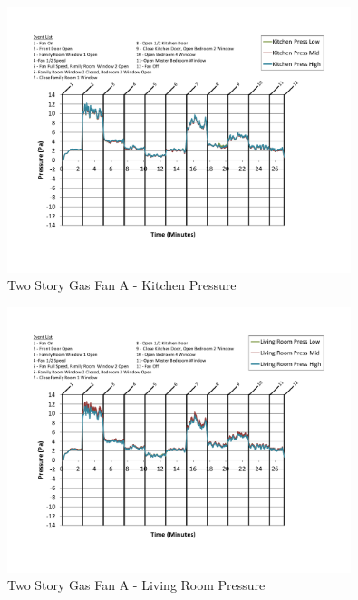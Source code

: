 \documentclass{article}
\begin{document}
\begin{appendices}
	\begin{figure}[H]
		\centering
		\includegraphics[height=3.05in,trim=0.67in 1.1in 0.67in 0.8in,clip=true]{0_Images/Results_Charts/ColdFlow/Two_Story/Gas/A/Kitchen_Pressure.pdf}
		\caption{Two Story Gas Fan A - Kitchen Pressure}
	\end{figure}
 

	\begin{figure}[H]
		\centering
		\includegraphics[height=3.05in,trim=0.67in 1.1in 0.67in 0.8in,clip=true]{0_Images/Results_Charts/ColdFlow/Two_Story/Gas/A/Living_Room_Pressure.pdf}
		\caption{Two Story Gas Fan A - Living Room Pressure}
	\end{figure}
 
	\clearpage


\end{appendices}
\end{document}
